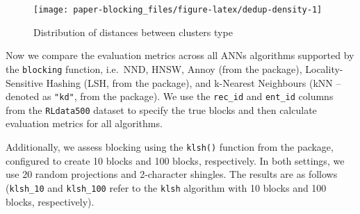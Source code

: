 \begin{figure}[ht!]

{\centering \texttt{[image: paper-blocking\_files/figure-latex/dedup-density-1]} 

}

\caption{Distribution of distances between clusters type}\label{fig:dedup-density}
\end{figure}

Now we compare the evaluation metrics across all ANNs algorithms
supported by the \texttt{blocking} function, i.e.~NND, HNSW, Annoy (from the  package),
Locality-Sensitive Hashing (LSH, from the  package), and
k-Nearest Neighbours (kNN -- denoted as \texttt{"kd"}, from the 
package). We use the \texttt{rec\_id} and \texttt{ent\_id} columns from the \texttt{RLdata500}
dataset to specify the true blocks and then calculate evaluation metrics
for all algorithms.

Additionally, we assess blocking using the \texttt{klsh()}
function from the  package, configured to create 10 blocks
and 100 blocks, respectively. In both settings, we use 20 random
projections and 2-character shingles. The results are as follows
(\texttt{klsh\_10} and \texttt{klsh\_100} refer to the \texttt{klsh} algorithm with 10 blocks
and 100 blocks, respectively).

